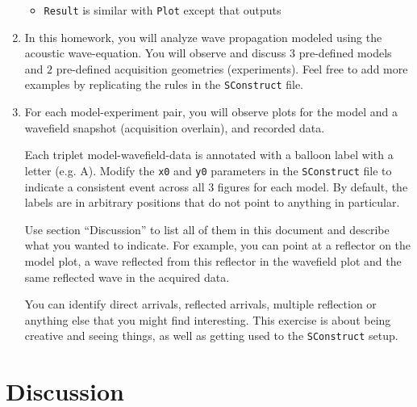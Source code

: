 \begin{enumerate}
\begin{itemize}
\item \texttt{Result} is similar with \texttt{Plot} except
that outputs

\end{itemize}

\item In this homework, you will analyze wave propagation modeled
using the acoustic wave-equation. 
You will observe and discuss $3$ pre-defined models and 
$2$ pre-defined acquisition geometries (experiments).
Feel free to add more examples by replicating the rules in the
\texttt{SConstruct} file.

\item 
For each model-experiment pair, you will observe
plots for the model and a wavefield snapshot (acquisition overlain),
and recorded data.

Each triplet model-wavefield-data is annotated with a balloon
label with a letter (e.g. A). 
Modify the \texttt{x0} and \texttt{y0} parameters in the 
\texttt{SConstruct} file to indicate a consistent event across 
all 3 figures for each model. By default, the labels are in
arbitrary positions that do not point to anything in particular.

Use section ``Discussion'' to list all of them in this document 
and describe what you wanted to indicate. For example, you can 
point at a reflector on the model plot,
a wave reflected from this reflector in the wavefield plot and
the same reflected wave in the acquired data.

You can identify direct arrivals, reflected arrivals, 
multiple reflection or anything else that you might find 
interesting.
This exercise is about being creative and seeing things,
as well as getting used to the  \texttt{SConstruct} setup.

\end{enumerate}



\section{Discussion}

